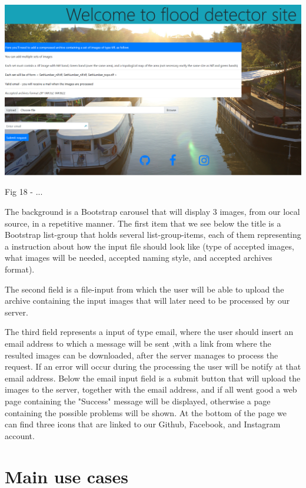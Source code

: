 \documentclass[12pt, a4paper]{report}
\begin{document}
\bigskip
\includegraphics[scale=0.4, center]{gui_homepage.png}
\begin{center}
Fig 18 - ... 
\end{center}
\par 

The background is a Bootstrap carousel that will display 3 images, from our local source, in a repetitive manner. The first item that we see below the title is a Bootstrap list-group that holds several list-group-items, each of them representing a instruction about how the input file should look like (type of accepted images, what images will be needed, accepted naming style, and accepted archives format).
\par 

The second field is a file-input from which the user will be able to upload the archive containing the input images that will later need to be processed by our server.
\par 

The third field represents a input of type email, where the user should insert an email address to which a message will be sent ,with a link from where the resulted images can be downloaded, after the server manages to process the request. If an error will occur during the processing the user will be notify at that email address. Below the email input field is a submit button that will upload the images to the server, together with the email address, and if all went good a web page containing the "Success" message will be displayed, otherwise a page containing the possible problems will be shown. At the bottom of the page we can find three icons that are linked to our Github, Facebook, and Instagram account.



\section{Main use cases}
\end{document}
